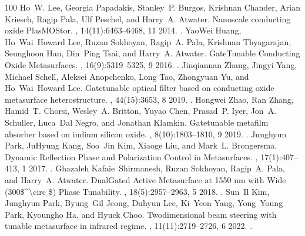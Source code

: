 \documentclass[a4paper,10pt,english,openany,oneside]{jupyterBook}
\begin{document}
\begin{sphinxthebibliography}{100}
\sphinxAtStartPar
Ho W. Lee, Georgia Papadakis, Stanley P. Burgos, Krishnan Chander, Arian Kriesch, Ragip Pala, Ulf Peschel, and Harry A. Atwater. Nanoscale conducting oxide PlasMOStor. , 14(11):6463–6468, 11 2014. .
\sphinxAtStartPar
Yao\sphinxhyphen{}Wei Huang, Ho Wai Howard Lee, Ruzan Sokhoyan, Ragip A. Pala, Krishnan Thyagarajan, Seunghoon Han, Din Ping Tsai, and Harry A. Atwater. Gate\sphinxhyphen{}Tunable Conducting Oxide Metasurfaces. , 16(9):5319–5325, 9 2016. .
\sphinxAtStartPar
Jinqiannan Zhang, Jingyi Yang, Michael Schell, Aleksei Anopchenko, Long Tao, Zhongyuan Yu, and Ho Wai Howard Lee. Gate\sphinxhyphen{}tunable optical filter based on conducting oxide metasurface heterostructure. , 44(15):3653, 8 2019. .
\sphinxAtStartPar
Hongwei Zhao, Ran Zhang, Hamid T. Chorsi, Wesley A. Britton, Yuyao Chen, Prasad P. Iyer, Jon A. Schuller, Luca Dal Negro, and Jonathan Klamkin. Gate\sphinxhyphen{}tunable metafilm absorber based on indium silicon oxide. , 8(10):1803–1810, 9 2019. .
\sphinxAtStartPar
Junghyun Park, Ju\sphinxhyphen{}Hyung Kang, Soo Jin Kim, Xiaoge Liu, and Mark L. Brongersma. Dynamic Reflection Phase and Polarization Control in Metasurfaces. , 17(1):407–413, 1 2017. .
\sphinxAtStartPar
Ghazaleh Kafaie Shirmanesh, Ruzan Sokhoyan, Ragip A. Pala, and Harry A. Atwater. Dual\sphinxhyphen{}Gated Active Metasurface at 1550 nm with Wide (300\$\textasciicircum{}\textbackslash{}circ \$) Phase Tunability. , 18(5):2957–2963, 5 2018. .
\sphinxAtStartPar
Sun Il Kim, Junghyun Park, Byung Gil Jeong, Duhyun Lee, Ki Yeon Yang, Yong Young Park, Kyoungho Ha, and Hyuck Choo. Two\sphinxhyphen{}dimensional beam steering with tunable metasurface in infrared regime. , 11(11):2719–2726, 6 2022. .

\end{sphinxthebibliography}
\end{document}
